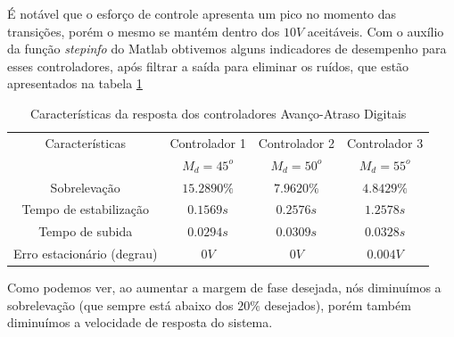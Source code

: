 \documentclass{article}
\begin{document}
É notável que o esforço de controle apresenta um pico no momento das transições, porém o mesmo se mantém dentro dos $10V$ aceitáveis.
Com o auxílio da função \textit{stepinfo} do Matlab obtivemos alguns indicadores de desempenho para esses controladores, após filtrar a saída para eliminar os ruídos, que estão apresentados na tabela \ref{tab:avatc}
\begin{table}[H]
	\centering
	\caption{Características da resposta dos controladores Avanço-Atraso Digitais}
	\label{tab:avatc}
	\begin{tabular}{|c|c|c|c|}
		\hline Características & Controlador 1& Controlador 2& Controlador 3 \\ 
		&$M_d = 45^o$&$M_d = 50^o$&$M_d = 55^o$\\
		\hline Sobrelevação & $15.2890\%$ & $7.9620\%$ & $4.8429\%$\\
		\hline Tempo de estabilização & $0.1569s$ & $0.2576s$ & $1.2578s$\\  
		\hline Tempo de subida & $0.0294s$ & $0.0309s$ & $0.0328s$\\ 
		\hline Erro estacionário (degrau)& $0V$ & $0V$& $0.004V$\\ 
		\hline 
	\end{tabular} 
\end{table}

Como podemos ver, ao aumentar a margem de fase desejada, nós diminuímos a sobrelevação (que sempre está abaixo dos $20\%$ desejados), porém também diminuímos a velocidade de resposta do sistema.
\end{document}
